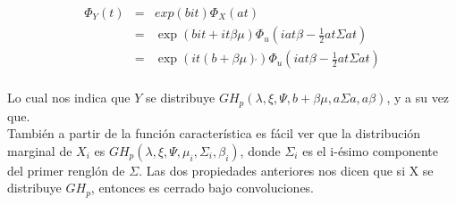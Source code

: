 \begin{eqnarray*}
\Phi_{Y}(t) &=&exp(bit)\Phi_{X}(at)\\
&=&\exp(bit+it\beta\mu\acute{})\Phi_{u}(iat\beta\acute{}-\frac{1}{2}at\Sigma at\acute{})\\
&=& \exp(it(b+\beta\mu)\acute{})\Phi_{u}(iat\beta\acute{}-\frac{1}{2}at\Sigma at\acute{})\\
\end{eqnarray*}

Lo cual nos indica que $Y$ se distribuye $GH_{p}(\lambda,\xi,\Psi,b+\beta\mu,a\Sigma a\acute{},a\beta)$, y a su vez que.\\

También a partir de la función característica es fácil ver que la distribución marginal de $X_{i}$ es 
$GH_{p}(\lambda,\xi,\Psi,\mu_{i},\Sigma _{i},\beta_{i})$, donde $\Sigma_{i}$ es el i-ésimo componente del primer renglón de $\Sigma$. Las dos propiedades anteriores nos dicen que si X se distribuye $GH_{p}$, entonces es cerrado bajo convoluciones.

